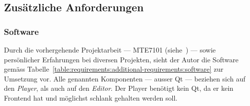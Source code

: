 
\subsection{Zusätzliche Anforderungen}
\label{subsec:requirements:additional-requirements}

\subsubsection{Software}
\label{subsec:requirements:additional-requirements:software}

Durch die vorhergehende Projektarbeit --- MTE7101
(siehe~\cite{osterwalder_sven_volume_2016}) --- sowie persönlicher Erfahrungen
bei diversen Projekten, sieht der Autor die Software gemäss
Tabelle~\ref{table:requirements:additional-requirements:software} zur Umsetzung
vor. Alle genannten Komponenten --- ausser Qt --- beziehen sich auf den
\textit{Player}, als auch auf den \textit{Editor}.  Der Player benötigt kein
Qt, da er kein Frontend hat und möglichst schlank gehalten werden soll.


